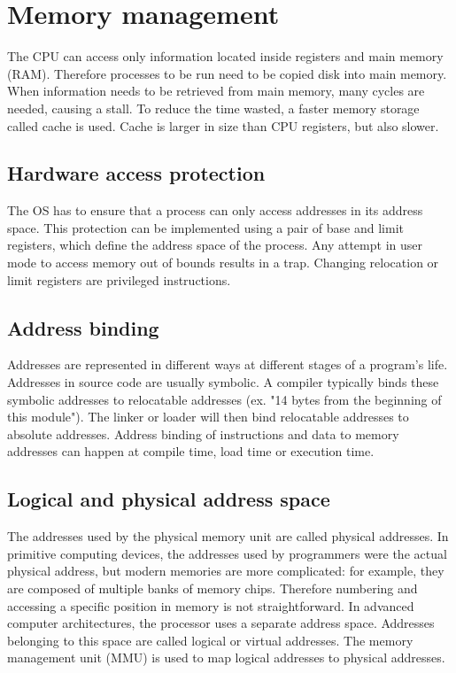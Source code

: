 \chapter{Memory management}

The CPU can access only information located inside registers and main memory (RAM). Therefore processes to be run need to be copied disk into main memory. When information needs to be retrieved from main memory, many cycles are needed, causing a stall. To reduce the time wasted, a faster memory storage called cache is used. Cache is larger in size than CPU registers, but also slower.


\section{Hardware access protection}
The OS has to ensure that a process can only access addresses in its address space. This protection can be implemented using a pair of base and limit registers, which define the address space of the process. Any attempt in user mode to access memory out of bounds results in a trap. Changing relocation or limit registers are privileged instructions.


\section{Address binding}
Addresses are represented in different ways at different stages of a program's life. Addresses in source code are usually symbolic. A compiler typically binds these symbolic addresses to relocatable addresses (ex. "14 bytes from the beginning of this module"). The linker or loader will then bind relocatable addresses to absolute addresses. Address binding of instructions and data to memory addresses can happen at compile time, load time or execution time.

\section{Logical and physical address space}
The addresses used by the physical memory unit are called physical addresses. In primitive computing devices, the addresses used by programmers were the actual physical address, but modern memories are more complicated: for example, they are composed of multiple banks of memory chips. Therefore numbering and accessing a specific position in memory is not straightforward. In advanced computer architectures, the processor uses a separate address space. Addresses belonging to this space are called logical or virtual addresses. The memory management unit (MMU) is used to map logical addresses to physical addresses.

